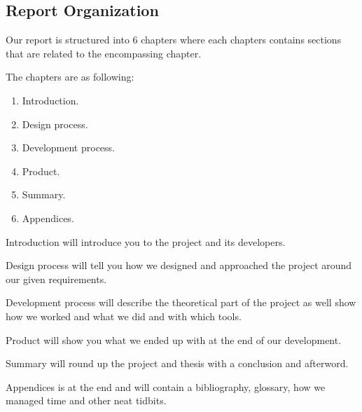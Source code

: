 \subsection{Report Organization}
\label{subsec:report_organization}

Our report is structured into 6 chapters where each chapters contains sections that are related to the encompassing chapter.

The chapters are as following:

\begin{enumerate}
	\item Introduction.
	\item Design process.
	\item Development process.
	\item Product.
	\item Summary.
	\item Appendices.
\end{enumerate}

Introduction will introduce you to the project and its developers.


Design process will tell you how we designed and approached the project around our given requirements.


Development process will describe the theoretical part of the project as well show how we worked and what we did and with which tools.


Product will show you what we ended up with at the end of our development.


Summary will round up the project and thesis with a conclusion and afterword.


Appendices is at the end and will contain a bibliography, glossary, how we managed time and other neat tidbits.

